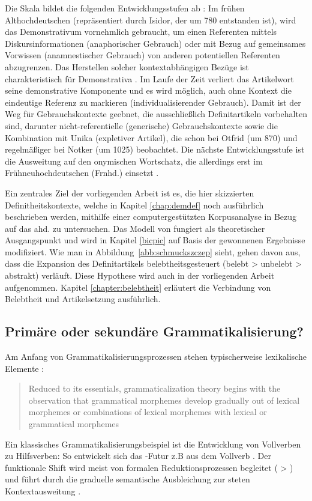 Die Skala bildet die folgenden Entwicklungsstufen ab \parencite[vgl. auch][69--78]{Szczepaniak2011a}: Im frühen Althochdeutschen (repräsentiert durch Isidor, der um 780 entstanden ist), wird das Demonstrativum vornehmlich gebraucht, um einen Referenten mittels Diskursinformationen (anaphorischer Gebrauch) oder mit Bezug auf gemeinsames Vorwissen (anamnestischer Gebrauch) von anderen potentiellen Referenten abzugrenzen. Das Herstellen solcher kontextabhängigen Bezüge ist charakteristisch für Demonstrativa \parencite[85]{Himmelmann1997}. Im Laufe der Zeit verliert das Artikelwort  seine demonstrative Komponente und es wird möglich, auch ohne Kontext die eindeutige Referenz zu markieren (individualisierender Gebrauch). Damit ist der Weg für Gebrauchskontexte geebnet, die ausschließlich Definitartikeln vorbehalten sind, darunter nicht-referentielle (generische) Gebrauchskontexte sowie die Kombination mit Unika (expletiver Artikel), die \textcite{Oubouzar1989,Oubouzar1992} schon bei Otfrid (um 870) und regelmäßiger bei Notker (um 1025) beobachtet. Die nächste Entwicklungsstufe ist die Ausweitung auf den onymischen Wortschatz, die allerdings erst im Frühneuhochdeutschen (Frnhd.) einsetzt \parencite[s. ausführlich][]{Schmuck2014}. 

Ein zentrales Ziel der vorliegenden Arbeit ist es, die hier skizzierten Definitheitskontexte, welche in Kapitel \ref{chap:demdef} noch ausführlich beschrieben werden, mithilfe einer computergestützten Korpusanalyse in Bezug auf das ahd.  zu untersuchen. Das Modell von \textcite{Schmuck2014} fungiert als theoretischer Ausgangspunkt und wird in Kapitel \ref{bicpic} auf Basis der gewonnenen Ergebnisse modifiziert. Wie man in Abbildung~\ref{abb:schmuckszczep} sieht, gehen \textcite{Schmuck2014} davon aus, dass die Expansion des Definitartikels belebtheitsgesteuert (belebt > unbelebt > abstrakt) verläuft. Diese Hypothese wird auch in der vorliegenden Arbeit aufgenommen. Kapitel \ref{chapter:belebtheit} erläutert die Verbindung von Belebtheit und Artikelsetzung ausführlich. 

 
\subsection{Primäre oder sekundäre Grammatikalisierung?} \label{sec:dem-quelle}

Am Anfang von Grammatikalisierungsprozessen stehen typischerweise lexikalische Elemente \parencite[s. ausführlich][]{Heine1991,Hopper1991,Traugott1991,Bybee1994,Lehmann2015}:  \blockcquote[4]{Bybee1994}{Reduced to its essentials, grammaticalization theory begins with the observation that grammatical morphemes develop gradually out of lexical morphemes or combinations of lexical morphemes with lexical or grammatical morphemes}. 
Ein klassisches Grammatikalisierungsbeispiel ist die Entwicklung von Vollverben zu Hilfsverben: So entwickelt sich das -Futur z.B aus dem Vollverb  \parencite[s.][70-71]{Heine1991}. Der funktionale Shift wird meist von formalen Reduktionsprozessen begleitet ( > ) und führt durch die graduelle semantische Ausbleichung \parencite{Heine2003} zur steten Kontextausweitung \parencite{Himmelmann2004}.  

